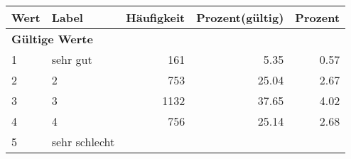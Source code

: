     \begin{longtable}{lXrrr}
     \toprule
     \textbf{Wert} & \textbf{Label} & \textbf{Häufigkeit} & \textbf{Prozent(gültig)} & \textbf{Prozent} \\
     \endhead
     \midrule
     \multicolumn{5}{l}{\textbf{Gültige Werte}}\\

     1 &
     \multicolumn{1}{X}{ sehr gut   } &


       \num{161} &
       \num[round-mode=places,round-precision=2]{5.35} &
         \num[round-mode=places,round-precision=2]{0.57} \\

     2 &
     \multicolumn{1}{X}{ 2   } &


       \num{753} &
       \num[round-mode=places,round-precision=2]{25.04} &
         \num[round-mode=places,round-precision=2]{2.67} \\

     3 &
     \multicolumn{1}{X}{ 3   } &


       \num{1132} &
       \num[round-mode=places,round-precision=2]{37.65} &
         \num[round-mode=places,round-precision=2]{4.02} \\

     4 &
     \multicolumn{1}{X}{ 4   } &


       \num{756} &
       \num[round-mode=places,round-precision=2]{25.14} &
         \num[round-mode=places,round-precision=2]{2.68} \\

     5 &
     \multicolumn{1}{X}{ sehr schlecht   } &



\end{longtable}
